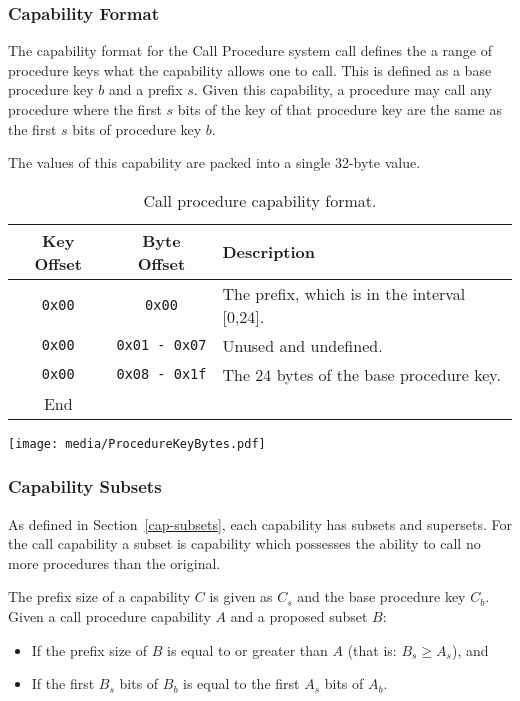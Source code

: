 \documentclass[english,a4paper]{article}
\let\oldparagraph\subsubsection
\renewcommand{\subsubsection}[1]{\oldparagraph{#1}\mbox{}}
\begin{document}
\subsubsection{Capability Format}
The capability format for the Call Procedure system call defines the a range of
procedure keys what the capability allows one to call. This is defined as a base
procedure key $b$ and a prefix $s$. Given this capability, a procedure may call
any procedure where the first $s$ bits of the key of that procedure key are the
same as the first $s$ bits of procedure key $b$.

The values of this capability are packed into a single 32-byte value.

\begin{table}[H]
  \caption{Call procedure capability format.}
  \centering{}%
  \begin{tabularx}{\textwidth}{c|c|X}
    \hline
    Key Offset & Byte Offset & Description \\
    \hline
    \hline
    \texttt{0x00} & \texttt{0x00} & The prefix, which is in the interval [0,24]. \\
    \texttt{0x00} & \texttt{0x01 - 0x07} & Unused and undefined. \\
    \texttt{0x00} & \texttt{0x08 - 0x1f} & The 24 bytes of the base procedure key. \\
    \hline
    End &   \\
    \hline
  \end{tabularx}
\end{table}

\texttt{[image: media/ProcedureKeyBytes.pdf]}

\subsubsection{Capability Subsets}
As defined in Section~\ref{cap-subsets}, each capability has subsets and
supersets. For the call capability a subset is capability which possesses the
ability to call no more procedures than the original.

The prefix size of a capability $C$ is given as $C_s$ and the base procedure key
$C_b$. Given a call procedure capability $A$ and a proposed subset $B$:
\begin{itemize}
  \item If the prefix size of $B$ is equal to or greater than $A$ (that is: $B_s
  \geq A_s$), and
  \item If the first $B_s$ bits of $B_b$ is equal to the first $A_s$ bits of
  $A_b$.
\end{itemize}
\end{document}
